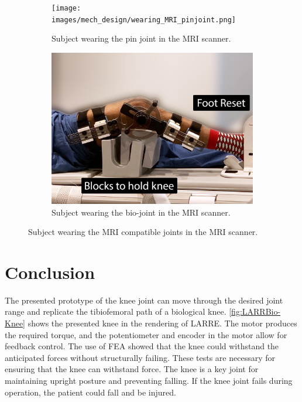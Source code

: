 \begin{figure}
    \begin{subfigure}{\textwidth}
        \centering
        \captionsetup{justification=centering}
        \texttt{[image: images/mech\_design/wearing\_MRI\_pinjoint.png]}
        \caption[Pin Joint in MRI ]{Subject wearing the pin joint in the MRI scanner.}
        \label{fig:MRIPINJoint}
    \end{subfigure}
    \begin{subfigure}{\textwidth}
        \centering
        \includegraphics[width=0.75\linewidth]{images/mech_design/wearing_MRI_bioknee.png}
          \captionsetup{justification=centering}
        \caption[Bio-joint in MRI]{Subject wearing the bio-joint in the MRI scanner.}
        \label{fig:MRIBIOJoint}
    \end{subfigure}

    \caption{Subject wearing the MRI compatible joints in the MRI scanner.}
    \label{fig:MRIKnees}
\end{figure}


  



\section{Conclusion}
The presented prototype of the knee joint can move through the desired joint range and replicate the tibiofemoral path of a biological knee. \autoref{fig:LARRBio-Knee} shows the presented knee in the rendering of LARRE. The motor produces the required torque, and the potentiometer and encoder in the motor allow for feedback control. The use of FEA showed that the knee could withstand the anticipated forces without structurally failing. These tests are necessary for ensuring that the knee can withstand force. The knee is a key joint for maintaining upright posture and preventing falling. If the knee joint fails during operation, the patient could fall and be injured. 


